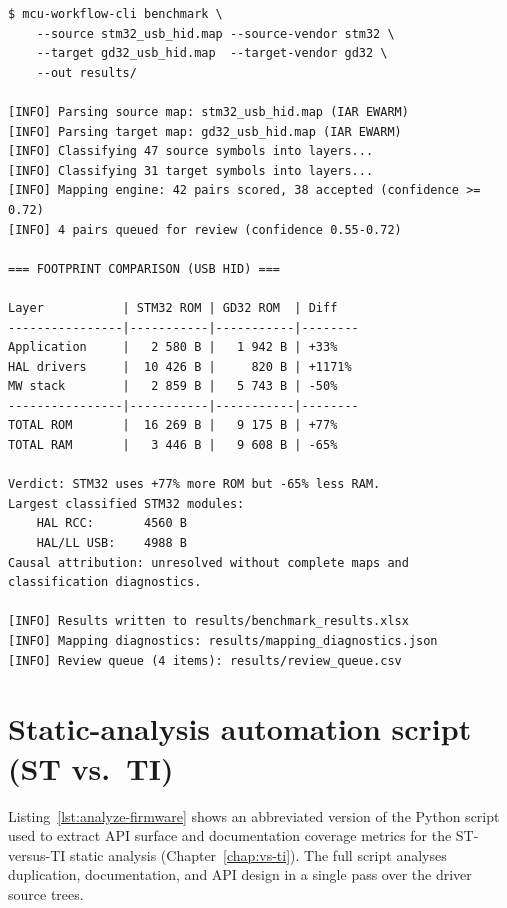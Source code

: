 \begin{lstlisting}[language={}, caption={MCU Workflow Studio CLI --- benchmark summary output.}, label={lst:tool-output}]
$ mcu-workflow-cli benchmark \
    --source stm32_usb_hid.map --source-vendor stm32 \
    --target gd32_usb_hid.map  --target-vendor gd32 \
    --out results/

[INFO] Parsing source map: stm32_usb_hid.map (IAR EWARM)
[INFO] Parsing target map: gd32_usb_hid.map (IAR EWARM)
[INFO] Classifying 47 source symbols into layers...
[INFO] Classifying 31 target symbols into layers...
[INFO] Mapping engine: 42 pairs scored, 38 accepted (confidence >= 0.72)
[INFO] 4 pairs queued for review (confidence 0.55-0.72)

=== FOOTPRINT COMPARISON (USB HID) ===

Layer           | STM32 ROM | GD32 ROM  | Diff
----------------|-----------|-----------|--------
Application     |   2 580 B |   1 942 B | +33%
HAL drivers     |  10 426 B |     820 B | +1171%
MW stack        |   2 859 B |   5 743 B | -50%
----------------|-----------|-----------|--------
TOTAL ROM       |  16 269 B |   9 175 B | +77%
TOTAL RAM       |   3 446 B |   9 608 B | -65%

Verdict: STM32 uses +77% more ROM but -65% less RAM.
Largest classified STM32 modules:
    HAL RCC:       4560 B
    HAL/LL USB:    4988 B
Causal attribution: unresolved without complete maps and classification diagnostics.

[INFO] Results written to results/benchmark_results.xlsx
[INFO] Mapping diagnostics: results/mapping_diagnostics.json
[INFO] Review queue (4 items): results/review_queue.csv
\end{lstlisting}

\pagebreak

\section{Static-analysis automation script (ST vs.\ TI)}
\label{sec:appendix-analyze-firmware}

Listing~\ref{lst:analyze-firmware} shows an abbreviated version of the Python script used
to extract API surface and documentation coverage metrics for the ST-versus-TI static
analysis (Chapter~\ref{chap:vs-ti}). The full script analyses duplication, documentation,
and API design in a single pass over the driver source trees.

